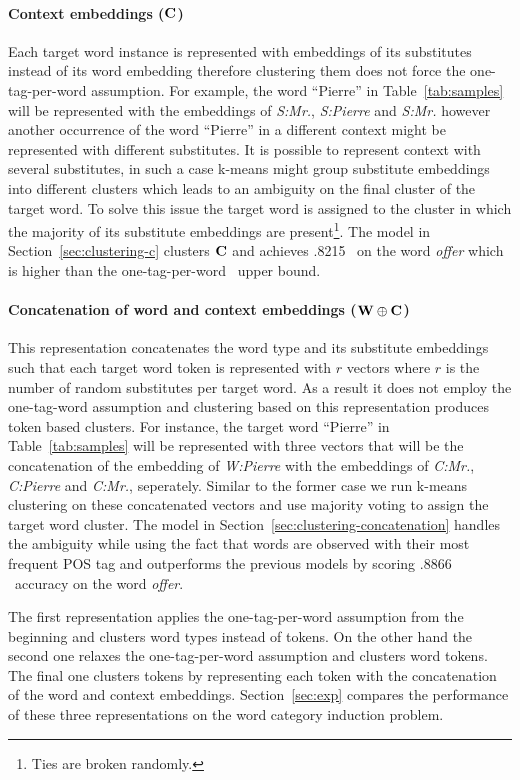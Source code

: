 \paragraph{Context embeddings (${\bf C}$)} 
Each target word instance is represented with embeddings of its
substitutes instead of its word embedding therefore clustering them
does not force the one-tag-per-word assumption.  For example, the word
``Pierre'' in Table~\ref{tab:samples} will be represented with the
embeddings of {\it S:Mr.}, {\it S:Pierre} and {\it S:Mr.}  however
another occurrence of the word ``Pierre'' in a different context might
be represented with different substitutes.  It is possible to
represent context with several substitutes, in such a case k-means
might group substitute embeddings into different clusters which leads
to an ambiguity on the final cluster of the target word.  To solve
this issue the target word is assigned to the cluster in which the
majority of its substitute embeddings are present\footnote{Ties are
  broken randomly.}.  The model in Section~\ref{sec:clustering-c}
clusters ${\bf C}$ and achieves .8215 \mto\ on the word {\it offer}
which is higher than the one-tag-per-word \mto\ upper bound.

\paragraph{Concatenation of word and context embeddings (${\bf W\oplus
    C}$)}
This representation concatenates the word type and its substitute
embeddings such that each target word token is represented with $r$
vectors where $r$ is the number of random substitutes per target word.
As a result it does not employ the one-tag-word assumption and
clustering based on this representation produces token based clusters.
For instance, the target word ``Pierre'' in Table~\ref{tab:samples}
will be represented with three vectors that will be the concatenation
of the embedding of {\it W:Pierre} with the embeddings of {\it C:Mr.},
{\it C:Pierre} and {\it C:Mr.}, seperately.  Similar to the former
case we run k-means clustering on these concatenated vectors and use
majority voting to assign the target word cluster.  The model in
Section~\ref{sec:clustering-concatenation} handles the ambiguity while
using the fact that words are observed with their most frequent POS
tag and outperforms the previous models by scoring .8866 \mto\
accuracy on the word {\it offer}.

The first representation applies the one-tag-per-word assumption from
the beginning and clusters word types instead of tokens.  On the other
hand the second one relaxes the one-tag-per-word assumption and
clusters word tokens.  The final one clusters tokens by representing
each token with the concatenation of the word and context embeddings.
Section~\ref{sec:exp} compares the performance of these three
representations on the word category induction problem.
